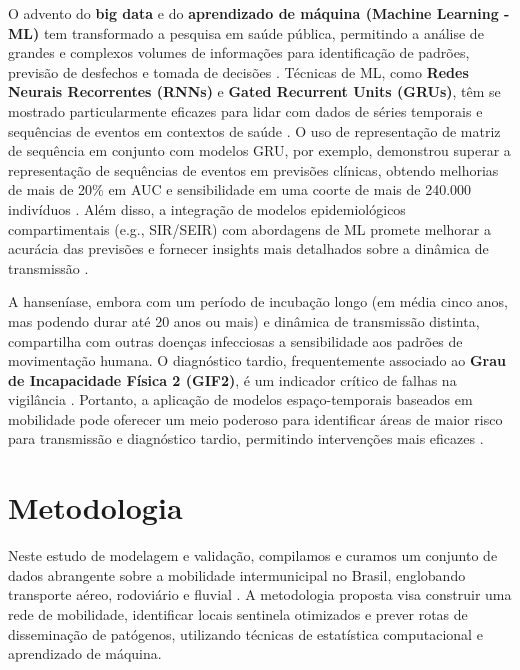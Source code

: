 \documentclass[preprint,12pt]{elsarticle}
\begin{document}
O advento do \textbf{big data} e do \textbf{aprendizado de máquina (Machine Learning - ML)} tem transformado a pesquisa em saúde pública, permitindo a análise de grandes e complexos volumes de informações para identificação de padrões, previsão de desfechos e tomada de decisões \cite{inovacao2024computacional, mooney2018big, saldanha2021resumo, saldanha2021inovacao}. Técnicas de ML, como \textbf{Redes Neurais Recorrentes (RNNs)} e \textbf{Gated Recurrent Units (GRUs)}, têm se mostrado particularmente eficazes para lidar com dados de séries temporais e sequências de eventos em contextos de saúde \cite{inovacao2024modelagem, shahidi2024exploring, shahidi2024conclusion, morid2023time, silva2022machine, madden2024deep}. O uso de representação de matriz de sequência em conjunto com modelos GRU, por exemplo, demonstrou superar a representação de sequências de eventos em previsões clínicas, obtendo melhorias de mais de 20\% em AUC e sensibilidade em uma coorte de mais de 240.000 indivíduos \cite{shahidi2024conclusion, shahidi2024contribution}. Além disso, a integração de modelos epidemiológicos compartimentais (e.g., SIR/SEIR) com abordagens de ML promete melhorar a acurácia das previsões e fornecer insights mais detalhados sobre a dinâmica de transmissão \cite{inovacao2024modelagem, silva2022machine, madden2024deep}.

A hanseníase, embora com um período de incubação longo (em média cinco anos, mas podendo durar até 20 anos ou mais) \cite{bacilo2022principal, scollard2016pathogenesis} e dinâmica de transmissão distinta, compartilha com outras doenças infecciosas a sensibilidade aos padrões de movimentação humana. O diagnóstico tardio, frequentemente associado ao \textbf{Grau de Incapacidade Física 2 (GIF2)}, é um indicador crítico de falhas na vigilância \cite{inovacao2024analise, hanseniase2022objetivos}. Portanto, a aplicação de modelos espaço-temporais baseados em mobilidade pode oferecer um meio poderoso para identificar áreas de maior risco para transmissão e diagnóstico tardio, permitindo intervenções mais eficazes \cite{inovacao2024analise}.

\section{Metodologia}

Neste estudo de modelagem e validação, compilamos e curamos um conjunto de dados abrangente sobre a mobilidade intermunicipal no Brasil, englobando transporte aéreo, rodoviário e fluvial \cite{oliveira2024summary, oliveira2024data}. A metodologia proposta visa construir uma rede de mobilidade, identificar locais sentinela otimizados e prever rotas de disseminação de patógenos, utilizando técnicas de estatística computacional e aprendizado de máquina.
\end{document}
